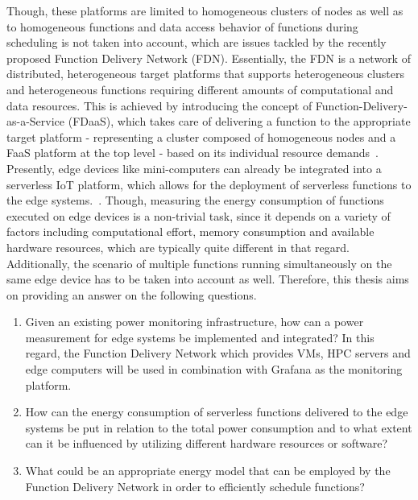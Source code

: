 Though, these platforms are limited to homogeneous clusters of nodes as well as to homogeneous functions and data access behavior of functions during scheduling is not taken into account, which are issues tackled by the recently proposed Function Delivery Network (FDN). Essentially, the FDN is a network of distributed, heterogeneous target platforms that supports heterogeneous clusters and heterogeneous functions requiring different amounts of computational and data resources. This is achieved by introducing the concept of Function-Delivery-as-a-Service (FDaaS), which takes care of delivering a function to the appropriate target platform - representing a cluster composed of homogeneous nodes and a FaaS platform at the top level - based on its individual resource demands~\parencite{fdn}. \\
Presently, edge devices like mini-computers can already be integrated into a serverless IoT platform, which allows for the deployment of serverless functions to the edge systems.~\parencite{fdn}. Though, measuring the energy consumption of functions executed on edge devices is a non-trivial task, since it depends on a variety of factors including computational effort, memory consumption and available hardware resources, which are typically quite different in that regard. Additionally, the scenario of multiple functions running simultaneously on the same edge device has to be taken into account as well. Therefore, this thesis aims on providing an answer on the following questions.

\begin{enumerate}
  \item Given an existing power monitoring infrastructure, how can a power measurement for edge systems be implemented and integrated? In this regard, the Function Delivery Network which provides VMs, HPC servers and edge computers will be used in combination with Grafana as the monitoring platform.
  \item How can the energy consumption of serverless functions delivered to the edge systems be put in relation to the total power consumption and to what extent can it be influenced by utilizing different hardware resources or software?
  \item What could be an appropriate energy model that can be employed by the Function Delivery Network in order to efficiently schedule functions?
\end{enumerate}

